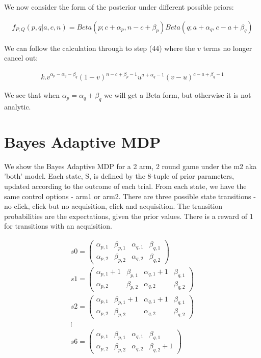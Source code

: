 \documentclass[11pt,a4,singlespacing,titlepagenumber=on]{scrreprt}
\numberwithin{equation}{chapter} %
\theoremstyle{remark}
\begin{document}
We now consider the form of the posterior under different possible priors:

\begin{align}
 f_{P,Q}(p,q|a,c,n) = Beta(p;c+\alpha_p,n-c+\beta_p) Beta(q;a+\alpha_q,c-a+\beta_q)
\end{align}

We can follow the calculation through to step (44) where the $v$ terms no longer cancel out:

\begin{align}
 k . v^{\alpha_p - \alpha_q - \beta_q}(1-v)^{n-c+\beta_p-1} u^{a+\alpha_q-1} (v - u)^{c-a+\beta_q-1}
\end{align}

We see that when $ \alpha_p = \alpha_q + \beta_q $ we will get a Beta form, but otherwise it is not analytic. 

\section{Bayes Adaptive MDP}

We show the Bayes Adaptive MDP for a 2 arm, 2 round game under the m2 aka 'both' model. Each state, S, is defined by the 8-tuple of prior parameters, updated according to the outcome of each trial. From each state, we have the same control options - arm1 or arm2. There are three possible state transitions - no click, click but no acquisition, click and acquisition. The transition probabilities are the expectations, given the prior values. There is a reward of 1 for transitions with an acquisition.

\begin{align}
s0 =
 \begin{pmatrix}
  \alpha_{p,1} & \beta_{p,1} & \alpha_{q,1} & \beta_{q,1} \\
  \alpha_{p,2} & \beta_{p,2} & \alpha_{q,2} & \beta_{q,2} 
 \end{pmatrix} \\
s1 =
  \begin{pmatrix}
   \alpha_{p,1}+1 & \beta_{p,1} & \alpha_{q,1}+1 & \beta_{q,1} \\
   \alpha_{p,2} & \beta_{p,2} & \alpha_{q,2} & \beta_{q,2} 
  \end{pmatrix} \\
s2 =
  \begin{pmatrix}
   \alpha_{p,1} & \beta_{p,1}+1 & \alpha_{q,1}+1 & \beta_{q,1} \\
   \alpha_{p,2} & \beta_{p,2} & \alpha_{q,2} & \beta_{q,2} 
  \end{pmatrix} \\
\vdots \\
s6 =
  \begin{pmatrix}
   \alpha_{p,1} & \beta_{p,1} & \alpha_{q,1} & \beta_{q,1} \\
   \alpha_{p,2} & \beta_{p,2} & \alpha_{q,2} & \beta_{q,2}+1 
  \end{pmatrix}
\end{align} 
\end{document}
